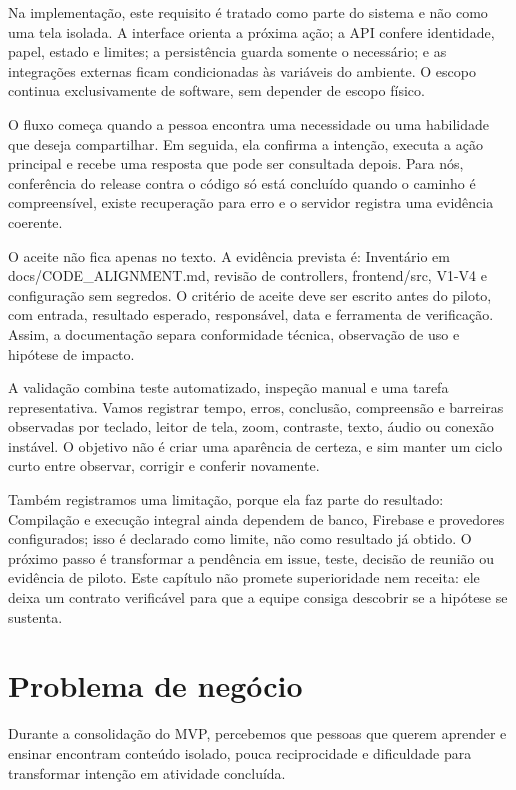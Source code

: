 \documentclass[12pt,oneside,a4paper,article]{abntex2}
\begin{document}
Na implementação, este requisito é tratado como parte do sistema e não como uma tela isolada. A interface orienta a próxima ação; a API confere identidade, papel, estado e limites; a persistência guarda somente o necessário; e as integrações externas ficam condicionadas às variáveis do ambiente. O escopo continua exclusivamente de software, sem depender de escopo físico.

O fluxo começa quando a pessoa encontra uma necessidade ou uma habilidade que deseja compartilhar. Em seguida, ela confirma a intenção, executa a ação principal e recebe uma resposta que pode ser consultada depois. Para nós, conferência do release contra o código só está concluído quando o caminho é compreensível, existe recuperação para erro e o servidor registra uma evidência coerente.

O aceite não fica apenas no texto. A evidência prevista é: Inventário em docs/CODE\_ALIGNMENT.md, revisão de controllers, frontend/src, V1-V4 e configuração sem segredos. O critério de aceite deve ser escrito antes do piloto, com entrada, resultado esperado, responsável, data e ferramenta de verificação. Assim, a documentação separa conformidade técnica, observação de uso e hipótese de impacto.

A validação combina teste automatizado, inspeção manual e uma tarefa representativa. Vamos registrar tempo, erros, conclusão, compreensão e barreiras observadas por teclado, leitor de tela, zoom, contraste, texto, áudio ou conexão instável. O objetivo não é criar uma aparência de certeza, e sim manter um ciclo curto entre observar, corrigir e conferir novamente.

Também registramos uma limitação, porque ela faz parte do resultado: Compilação e execução integral ainda dependem de banco, Firebase e provedores configurados; isso é declarado como limite, não como resultado já obtido. O próximo passo é transformar a pendência em issue, teste, decisão de reunião ou evidência de piloto. Este capítulo não promete superioridade nem receita: ele deixa um contrato verificável para que a equipe consiga descobrir se a hipótese se sustenta.

\section{Problema de negócio}
Durante a consolidação do MVP, percebemos que pessoas que querem aprender e ensinar encontram conteúdo isolado, pouca reciprocidade e dificuldade para transformar intenção em atividade concluída.
\end{document}

